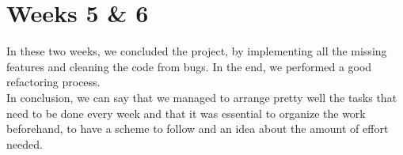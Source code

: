 \section{Weeks 5 \& 6}
In these two weeks, we concluded the project, by implementing all the missing features and cleaning the code from bugs. In the end, we performed a good refactoring process.\\
In conclusion, we can say that we managed to arrange pretty well the tasks that need to be done every week and that it was essential to organize the work beforehand, to have a scheme to follow and an idea about the amount of effort needed.
